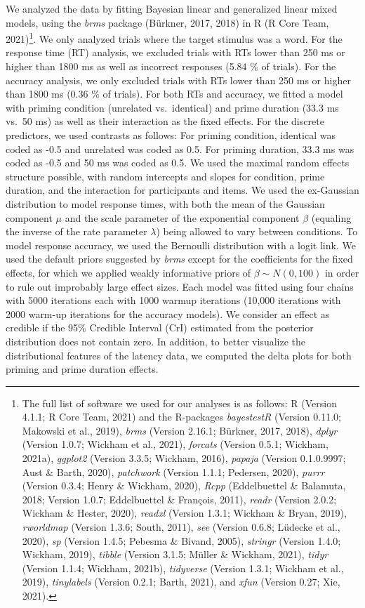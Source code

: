 \documentclass[
  english,
  man,floatsintext]{apa6}
\begin{document}
We analyzed the data by fitting Bayesian linear and generalized linear mixed models, using the \emph{brms} package (Bürkner, 2017, 2018) in R (R Core Team, 2021)\footnote{The full list of software we used for our analyses is as follows: R (Version 4.1.1; R Core Team, 2021) and the R-packages \emph{bayestestR} (Version 0.11.0; Makowski et al., 2019), \emph{brms} (Version 2.16.1; Bürkner, 2017, 2018), \emph{dplyr} (Version 1.0.7; Wickham et al., 2021), \emph{forcats} (Version 0.5.1; Wickham, 2021a), \emph{ggplot2} (Version 3.3.5; Wickham, 2016), \emph{papaja} (Version 0.1.0.9997; Aust \& Barth, 2020), \emph{patchwork} (Version 1.1.1; Pedersen, 2020), \emph{purrr} (Version 0.3.4; Henry \& Wickham, 2020), \emph{Rcpp} (Eddelbuettel \& Balamuta, 2018; Version 1.0.7; Eddelbuettel \& François, 2011), \emph{readr} (Version 2.0.2; Wickham \& Hester, 2020), \emph{readxl} (Version 1.3.1; Wickham \& Bryan, 2019), \emph{rworldmap} (Version 1.3.6; South, 2011), \emph{see} (Version 0.6.8; Lüdecke et al., 2020), \emph{sp} (Version 1.4.5; Pebesma \& Bivand, 2005), \emph{stringr} (Version 1.4.0; Wickham, 2019), \emph{tibble} (Version 3.1.5; Müller \& Wickham, 2021), \emph{tidyr} (Version 1.1.4; Wickham, 2021b), \emph{tidyverse} (Version 1.3.1; Wickham et al., 2019), \emph{tinylabels} (Version 0.2.1; Barth, 2021), and \emph{xfun} (Version 0.27; Xie, 2021).}. We only analyzed trials where the target stimulus was a word. For the response time (RT) analysis, we excluded trials with RTs lower than 250 ms or higher than 1800 ms as well as incorrect responses (5.84 \% of trials). For the accuracy analysis, we only excluded trials with RTs lower than 250 ms or higher than 1800 ms (0.36 \% of trials). For both RTs and accuracy, we fitted a model with priming condition (unrelated vs.~identical) and prime duration (33.3 ms vs.~50 ms) as well as their interaction as the fixed effects. For the discrete predictors, we used contrasts as follows: For priming condition, identical was coded as -0.5 and unrelated was coded as 0.5. For priming duration, 33.3 ms was coded as -0.5 and 50 ms was coded as 0.5. We used the maximal random effects structure possible, with random intercepts and slopes for condition, prime duration, and the interaction for participants and items. We used the ex-Gaussian distribution to model response times, with both the mean of the Gaussian component \(\mu\) and the scale parameter of the exponential component \(\beta\) (equaling the inverse of the rate parameter \(\lambda\)) being allowed to vary between conditions. To model response accuracy, we used the Bernoulli distribution with a logit link. We used the default priors suggested by \emph{brms} except for the coefficients for the fixed effects, for which we applied weakly informative priors of \(\beta \sim N(0,100)\) in order to rule out improbably large effect sizes. Each model was fitted using four chains with 5000 iterations each with 1000 warmup iterations (10,000 iterations with 2000 warm-up iterations for the accuracy models). We consider an effect as credible if the 95\% Credible Interval (CrI) estimated from the posterior distribution does not contain zero. In addition, to better visualize the distributional features of the latency data, we computed the delta plots for both priming and prime duration effects.
\end{document}
